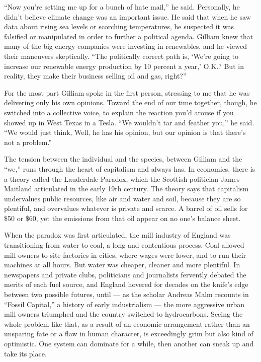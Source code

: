 ``Now you're setting me up for a bunch of hate mail,'' he said.
Personally, he didn't believe climate change was an important issue. He
said that when he saw data about rising sea levels or scorching
temperatures, he suspected it was falsified or manipulated in order to
further a political agenda. Gilliam knew that many of the big energy
companies were investing in renewables, and he viewed their maneuvers
skeptically. ``The politically correct path is, `We're going to increase
our renewable energy production by 10 percent a year,' O.K.? But in
reality, they make their business selling oil and gas, right?''

For the most part Gilliam spoke in the first person, stressing to me
that he was delivering only his own opinions. Toward the end of our time
together, though, he switched into a collective voice, to explain the
reaction you'd arouse if you showed up in West Texas in a Tesla. ``We
wouldn't tar and feather you,'' he said. ``We would just think, Well, he
has his opinion, but our opinion is that there's not a problem.''

The tension between the individual and the species, between Gilliam and
the ``we,'' runs through the heart of capitalism and always has. In
economics, there is a theory called the Lauderdale Paradox, which the
Scottish politician James Maitland articulated in the early 19th
century. The theory says that capitalism undervalues public resources,
like air and water and soil, because they are so plentiful, and
overvalues whatever is private and scarce. A barrel of oil sells for
\$50 or \$60, yet the emissions from that oil appear on no one's balance
sheet.

When the paradox was first articulated, the mill industry of England was
transitioning from water to coal, a long and contentious process. Coal
allowed mill owners to site factories in cities, where wages were lower,
and to run their machines at all hours. But water was cheaper, cleaner
and more plentiful. In newspapers and private clubs, politicians and
journalists fervently debated the merits of each fuel source, and
England hovered for decades on the knife's edge between two possible
futures, until --- as the scholar Andreas Malm recounts in ``Fossil
Capital,'' a history of early industrialism --- the more aggressive
urban mill owners triumphed and the country switched to hydrocarbons.
Seeing the whole problem like that, as a result of an economic
arrangement rather than an unsparing fate or a flaw in human character,
is exceedingly grim but also kind of optimistic. One system can dominate
for a while, then another can sneak up and take its place.

